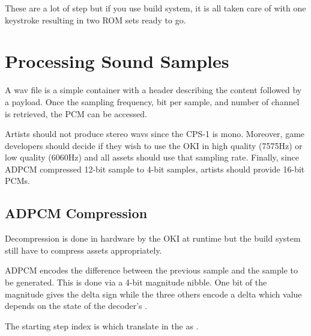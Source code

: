 \begin{trivia}
These are a lot of step but if you use  build system, it is all taken care of with one keystroke resulting in two ROM sets ready to go.
\end{trivia}






\section{Processing Sound Samples}
A wav file is a simple container with a header describing the content followed by a payload. Once the sampling frequency, bit per sample, and number of channel is retrieved, the PCM can be accessed.

Artists should not produce stereo wavs since the CPS-1 is mono. Moreover, game developers should decide if they wish to use the OKI in high quality (7575Hz) or low quality (6060Hz) and all assets should use that sampling rate. Finally, since ADPCM compressed 12-bit sample to 4-bit samples, artists should provide 16-bit PCMs.


\subsection{ADPCM Compression}
Decompression is done in hardware by the OKI at runtime but the build system still have to compress assets appropriately. 


ADPCM encodes the difference between the previous sample and the sample to be generated. This is done via a 4-bit magnitude nibble. One bit of the magnitude gives the delta sign while the three others encode a delta which value depends on the state of the decoder's .





The starting step index is  which translate in the  as .

 

